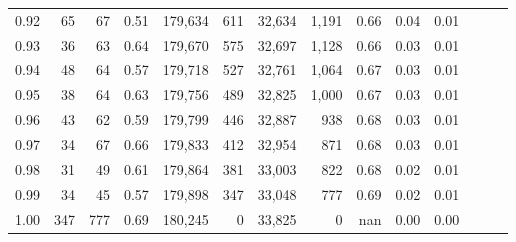 \begin{tabular}{rrrrrrrrrrrrrr}
0.92 &     65 &   67 &  0.51 &  179,634 &      611 &  32,634 &   1,191 &  0.66 &  0.04 &      0.01 \\
0.93 &     36 &   63 &  0.64 &  179,670 &      575 &  32,697 &   1,128 &  0.66 &  0.03 &      0.01 \\
0.94 &     48 &   64 &  0.57 &  179,718 &      527 &  32,761 &   1,064 &  0.67 &  0.03 &      0.01 \\
0.95 &     38 &   64 &  0.63 &  179,756 &      489 &  32,825 &   1,000 &  0.67 &  0.03 &      0.01 \\
0.96 &     43 &   62 &  0.59 &  179,799 &      446 &  32,887 &     938 &  0.68 &  0.03 &      0.01 \\
0.97 &     34 &   67 &  0.66 &  179,833 &      412 &  32,954 &     871 &  0.68 &  0.03 &      0.01 \\
0.98 &     31 &   49 &  0.61 &  179,864 &      381 &  33,003 &     822 &  0.68 &  0.02 &      0.01 \\
0.99 &     34 &   45 &  0.57 &  179,898 &      347 &  33,048 &     777 &  0.69 &  0.02 &      0.01 \\
1.00 &    347 &  777 &  0.69 &  180,245 &        0 &  33,825 &       0 &   nan &  0.00 &      0.00 \\
\bottomrule
\end{tabular}
